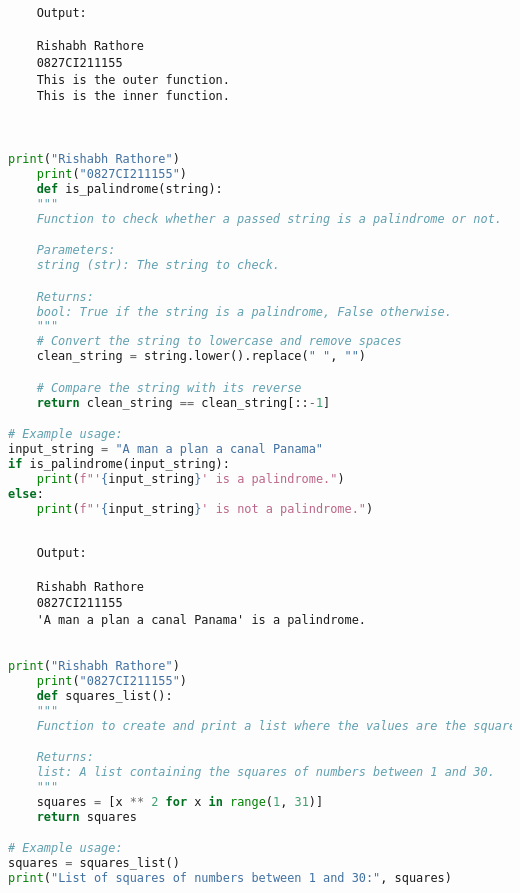 \documentclass{report}
\begin{document}
\begin{verbatim}
	Output:

	Rishabh Rathore
	0827CI211155
	This is the outer function.
	This is the inner function.
	
	

\end{verbatim}

\newpage


\sol 
\begin{lstlisting}[language=Python]
	print("Rishabh Rathore")
	print("0827CI211155")
	def is_palindrome(string):
    """
    Function to check whether a passed string is a palindrome or not.

    Parameters:
    string (str): The string to check.

    Returns:
    bool: True if the string is a palindrome, False otherwise.
    """
    # Convert the string to lowercase and remove spaces
    clean_string = string.lower().replace(" ", "")

    # Compare the string with its reverse
    return clean_string == clean_string[::-1]

# Example usage:
input_string = "A man a plan a canal Panama"
if is_palindrome(input_string):
    print(f"'{input_string}' is a palindrome.")
else:
    print(f"'{input_string}' is not a palindrome.")
  

\end{lstlisting}

\begin{verbatim}
	Output:

	Rishabh Rathore
	0827CI211155
	'A man a plan a canal Panama' is a palindrome.
	
\end{verbatim}

\newpage


\sol 
\begin{lstlisting}[language=Python]
	print("Rishabh Rathore")
	print("0827CI211155")
	def squares_list():
    """
    Function to create and print a list where the values are the squares of numbers between 1 and 30.

    Returns:
    list: A list containing the squares of numbers between 1 and 30.
    """
    squares = [x ** 2 for x in range(1, 31)]
    return squares

# Example usage:
squares = squares_list()
print("List of squares of numbers between 1 and 30:", squares)
  

\end{lstlisting}
\end{document}
